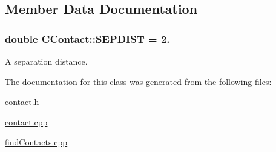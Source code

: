 \subsection{Member Data Documentation}
\hypertarget{classCContact_ad644f8a39a8f8778cac26a8c7a56e7fa}{
\subsubsection[{S\-E\-P\-D\-I\-S\-T}]{\setlength{\rightskip}{0pt plus 5cm}double C\-Contact\-::\-S\-E\-P\-D\-I\-S\-T = 2.\hspace{0.3cm}{\ttfamily [static]}}}\label{classCContact_ad644f8a39a8f8778cac26a8c7a56e7fa}


A separation distance. 



The documentation for this class was generated from the following files\-:\begin{DoxyCompactItemize}
\item 
\hyperlink{contact_8h}{contact.\-h}\item 
\hyperlink{contact_8cpp}{contact.\-cpp}\item 
\hyperlink{findContacts_8cpp}{find\-Contacts.\-cpp}\end{DoxyCompactItemize}
